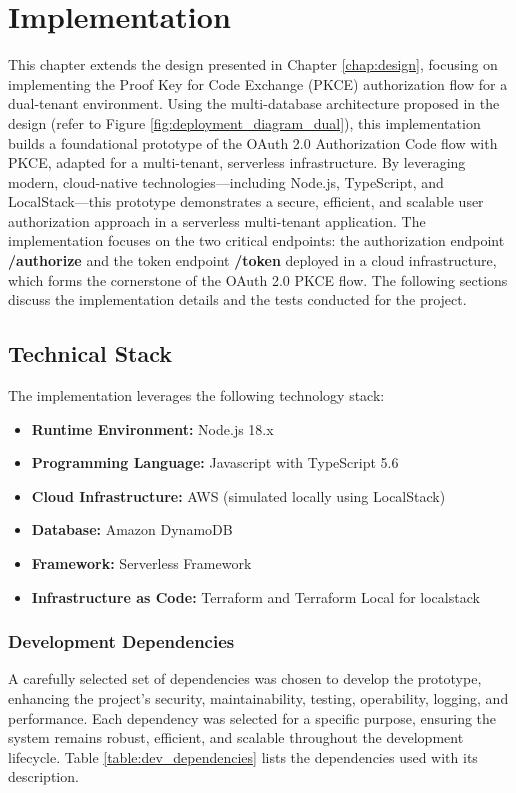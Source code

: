 \chapter{Implementation}

This chapter extends the design presented in Chapter \ref{chap:design}, focusing on implementing the Proof Key for Code Exchange (PKCE) authorization flow for a dual-tenant environment. Using the multi-database architecture proposed in the design (refer to Figure \ref{fig:deployment_diagram_dual}), this implementation builds a foundational prototype of the OAuth 2.0 Authorization Code flow with PKCE, adapted for a multi-tenant, serverless infrastructure. By leveraging modern, cloud-native technologies—including Node.js, TypeScript, and LocalStack—this prototype demonstrates a secure, efficient, and scalable user authorization approach in a serverless multi-tenant application. The implementation focuses on the two critical endpoints: the authorization endpoint \textbf{/authorize} and the token endpoint \textbf{/token} deployed in a cloud infrastructure, which forms the cornerstone of the OAuth 2.0 PKCE flow. The following sections discuss the implementation details and the tests conducted for the project.


\section{Technical Stack}

The implementation leverages the following technology stack:
\begin{itemize}
    \item \textbf{Runtime Environment:} Node.js 18.x
    \item \textbf{Programming Language:} Javascript with TypeScript 5.6
    \item \textbf{Cloud Infrastructure:} AWS (simulated locally using LocalStack)
    \item \textbf{Database:} Amazon DynamoDB
    \item \textbf{Framework:} Serverless Framework
    \item \textbf{Infrastructure as Code:} Terraform and Terraform Local for localstack

\end{itemize}

\subsection{Development Dependencies}
A carefully selected set of dependencies was chosen to develop the prototype, enhancing the project's security, maintainability, testing, operability, logging, and performance. Each dependency was selected for a specific purpose, ensuring the system remains robust, efficient, and scalable throughout the development lifecycle. Table \ref{table:dev_dependencies} lists the dependencies used with its description. 

